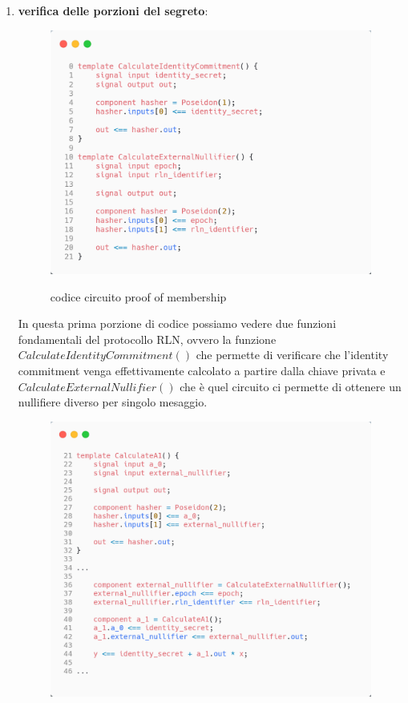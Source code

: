 \begin{enumerate}
    \item \textbf{verifica delle porzioni del segreto}:
    \begin{figure}[H]
        \centering
        \includegraphics[width=11cm]{./chapters/3.poc/images/2.1.verify_shares.png}
        \label{fig:1.verify_shares}
        \captionsetup{justification=centering}
        \caption{codice circuito proof of membership}
    \end{figure}
    In questa prima porzione di codice possiamo vedere due funzioni fondamentali del protocollo RLN, ovvero la funzione $CalculateIdentityCommitment()$ che permette di verificare che l'identity commitment venga effettivamente calcolato a partire dalla chiave privata e $CalculateExternalNullifier()$ che è quel circuito ci permette di ottenere un nullifiere diverso per singolo mesaggio.\clearpage
    \begin{figure}[H]
        \centering
        \includegraphics[width=11cm]{./chapters/3.poc/images/2.2.verify_shares.png}

\end{figure}
\end{enumerate}
